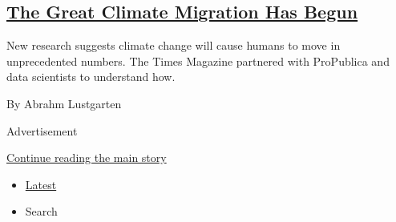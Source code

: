 \begin{enumerate}
  \hypertarget{the-great-climate-migration-has-begun}{%
  \subsection{\texorpdfstring{\href{/interactive/2020/07/23/magazine/climate-migration.html}{The
  Great Climate Migration Has
  Begun}}{The Great Climate Migration Has Begun}}\label{the-great-climate-migration-has-begun}}

  New research suggests climate change will cause humans to move in
  unprecedented numbers. The Times Magazine partnered with ProPublica
  and data scientists to understand how.

  By Abrahm Lustgarten
\end{enumerate}

Advertisement

\protect\hyperlink{after-mid1}{Continue reading the main story}

\begin{itemize}
\tightlist
\item
  \protect\hyperlink{stream-panel}{Latest}
\item
  Search
\end{itemize}

